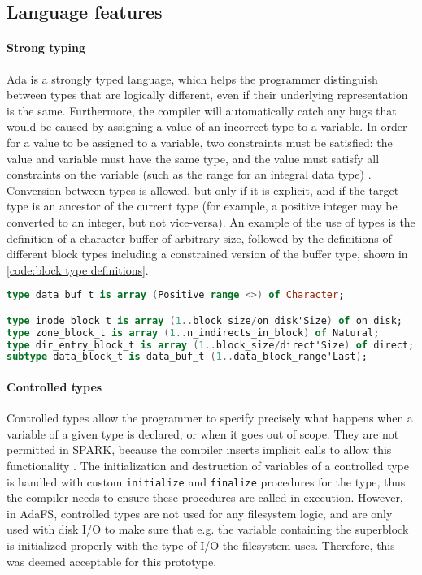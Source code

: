 \subsection{Language features}

\paragraph{Strong typing}
Ada is a strongly typed language, which helps the programmer distinguish between types that are logically different, even if their underlying representation is the same.
Furthermore, the compiler will automatically catch any bugs that would be caused by assigning a value of an incorrect type to a variable.
In order for a value to be assigned to a variable, two constraints must be satisfied: the value and variable must have the same type, and the value must satisfy all constraints on the variable (such as the range for an integral data type) \cite{barnes2014}.
Conversion between types is allowed, but only if it is explicit, and if the target type is an ancestor of the current type (for example, a positive integer may be converted to an integer, but not vice-versa).
An example of the use of types is the definition of a character buffer of arbitrary size, followed by the definitions of different block types including a constrained version of the buffer type, shown in \autoref{code:block type definitions}.

\begin{lstlisting}[float=tb,caption={Block type definitions}, label={code:block type definitions}, language=Ada]
type data_buf_t is array (Positive range <>) of Character;

type inode_block_t is array (1..block_size/on_disk'Size) of on_disk;
type zone_block_t is array (1..n_indirects_in_block) of Natural;
type dir_entry_block_t is array (1..block_size/direct'Size) of direct;
subtype data_block_t is data_buf_t (1..data_block_range'Last);
\end{lstlisting}

\paragraph{Controlled types}
Controlled types allow the programmer to specify precisely what happens when a variable of a given type is declared, or when it goes out of scope.
They are not permitted in SPARK, because the compiler inserts implicit calls to allow this functionality \cite{sparkRM}.
The initialization and destruction of variables of a controlled type is handled with custom \lstinline[language=Ada]{initialize} and \lstinline[language=Ada]{finalize} procedures for the type, thus the compiler needs to ensure these procedures are called in execution.
However, in AdaFS, controlled types are not used for any filesystem logic, and are only used with disk I/O to make sure that e.g. the variable containing the superblock is initialized properly with the type of I/O the filesystem uses.
Therefore, this was deemed acceptable for this prototype.

